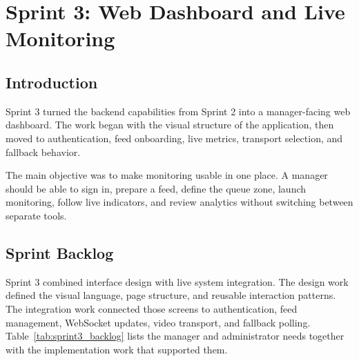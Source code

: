 \chapter{Sprint 3: Web Dashboard and Live Monitoring}
\chaptertoc

\clearpage

\section{Introduction}
Sprint 3 turned the backend capabilities from Sprint 2 into a manager-facing web dashboard. The work began with the visual structure of the application, then moved to authentication, feed onboarding, live metrics, transport selection, and fallback behavior.

The main objective was to make monitoring usable in one place. A manager should be able to sign in, prepare a feed, define the queue zone, launch monitoring, follow live indicators, and review analytics without switching between separate tools.

\section{Sprint Backlog}
Sprint 3 combined interface design with live system integration. The design work defined the visual language, page structure, and reusable interaction patterns. The integration work connected those screens to authentication, feed management, WebSocket updates, video transport, and fallback polling. Table~\ref{tab:sprint3_backlog} lists the manager and administrator needs together with the implementation work that supported them.

